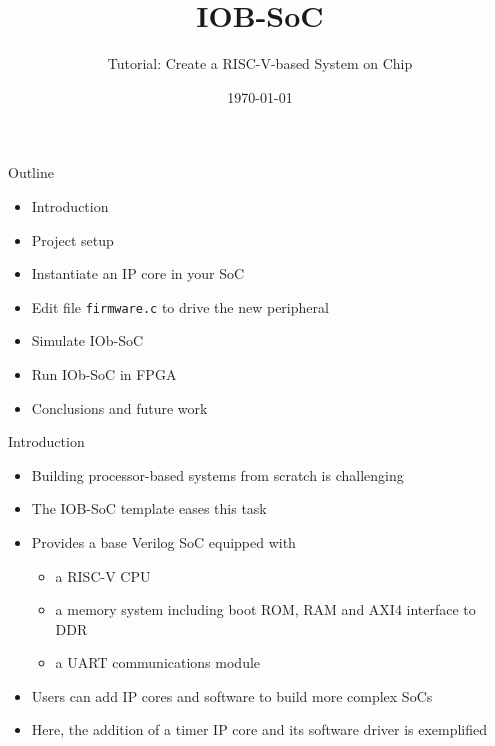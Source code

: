 \documentclass [xcolor=svgnames, t] {beamer}
\title[IOB-SoC Presentation]{IOB-SoC}
\subtitle{Tutorial: Create a RISC-V-based System on Chip}
\institute[IObundle Lda]{IObundle Lda.\\The Architecture for an Agile World}
\institute[IObundle Lda]{IObundle Lda}
\date{\today}
\begin{document}
\begin{frame}
 \titlepage   
\end{frame}


\begin{frame}{Outline}
\begin{center}
   \begin{itemize}
     \item Introduction
     \item Project setup
     \item Instantiate an IP core in your SoC
     \item Edit file {\tt firmware.c} to drive the new peripheral
     \item Simulate IOb-SoC
     \item Run IOb-SoC in FPGA
     \item Conclusions and future work
 \end{itemize}
\end{center}
\end{frame}


\begin{frame}{Introduction}
\begin{center}
    \begin{itemize}
      \item Building processor-based systems from scratch is challenging
      \item The IOB-SoC template eases this task
      \item Provides a base Verilog SoC equipped with
        \begin{itemize}
        \item a RISC-V CPU
        \item a memory system including boot ROM, RAM and AXI4 interface to DDR
        \item a UART communications module
        \end{itemize}
      \item Users can add IP cores and software to build more complex SoCs
      \item Here, the addition of a timer IP core and its software driver is exemplified
    \end{itemize}
\end{center}
\end{frame}
\end{document}
